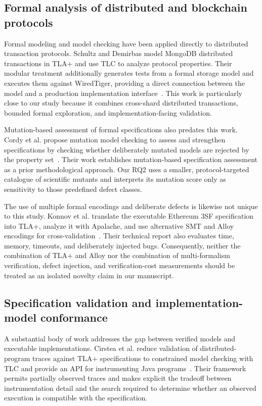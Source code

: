 \subsection{Formal analysis of distributed and blockchain protocols}
\label{subsec:related-formal-analysis}

Formal modeling and model checking have been applied directly to distributed
transaction protocols. Schultz and Demirbas model MongoDB distributed
transactions in TLA+ and use TLC to analyze protocol properties. Their modular
treatment additionally generates tests from a formal storage model and
executes them against WiredTiger, providing a direct connection between the
model and a production implementation interface~\cite{schultz2025mongodb}.
This work is particularly close to our study because it combines cross-shard
distributed transactions, bounded formal exploration, and implementation-facing
validation.

Mutation-based assessment of formal specifications also predates this work.
Cordy et al. propose mutation model checking to assess and strengthen
specifications by checking whether deliberately mutated models are rejected by
the property set~\cite{cordy2023mutation}. Their work establishes
mutation-based specification assessment as a prior methodological approach.
Our RQ2 uses a smaller, protocol-targeted catalogue of scientific mutants and
interprets its mutation score only as sensitivity to those predefined defect
classes.

The use of multiple formal encodings and deliberate defects is likewise not
unique to this study. Konnov et al. translate the executable Ethereum 3SF
specification into TLA+, analyze it with Apalache, and use alternative SMT and
Alloy encodings for cross-validation~\cite{konnov2025ethereum}. Their technical
report also evaluates time, memory, timeouts, and deliberately injected bugs.
Consequently, neither the combination of TLA+ and Alloy nor the combination of
multi-formalism verification, defect injection, and verification-cost
measurements should be treated as an isolated novelty claim in our manuscript.

\subsection{Specification validation and implementation-model conformance}
\label{subsec:related-conformance}

A substantial body of work addresses the gap between verified models and
executable implementations. Cirstea et al. reduce validation of
distributed-program traces against TLA+ specifications to constrained model
checking with TLC and provide an API for instrumenting Java
programs~\cite{cirstea2025traces}. Their framework permits partially observed
traces and makes explicit the tradeoff between instrumentation detail and the
search required to determine whether an observed execution is compatible with
the specification.

